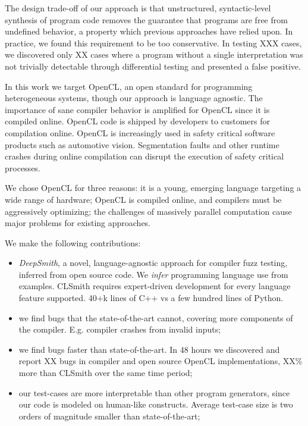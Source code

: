 The design trade-off of our approach is that unstructured, syntactic-level synthesis of program code removes the guarantee that programs are free from undefined behavior, a property which previous approaches have relied upon. In practice, we found this requirement to be too conservative. In testing XXX cases, we discovered only XX cases where a program without a single interpretation was not trivially detectable through differential testing and presented a false positive.

In this work we target OpenCL, an open standard for programming heterogeneous systems, though our approach is language agnostic. The importance of sane compiler behavior is amplified for OpenCL since it is compiled online. OpenCL code is shipped by developers to customers for compilation online. OpenCL is increasingly used in safety critical software products such as automotive vision. Segmentation faults and other runtime crashes during online compilation can disrupt the execution of safety critical processes.

We chose OpenCL for three reasons:
it is a young, emerging language targeting a wide range of hardware;
OpenCL is compiled online, and compilers must be aggressively optimizing;
the challenges of massively parallel computation cause major problems for existing approaches.

We make the following contributions:
%
\begin{itemize}
\item \emph{DeepSmith}, a novel, language-agnostic approach for compiler fuzz testing, inferred from open source code. We \emph{infer} programming language use from examples. CLSmith requires expert-driven development for every language feature supported. 40+k lines of C++ vs a few hundred lines of Python.
\item we find bugs that the state-of-the-art cannot, covering more components of the compiler. E.g. compiler crashes from invalid inputs;
\item we find bugs faster than state-of-the-art. In 48 hours we discovered and report XX bugs in compiler and open source OpenCL implementations, XX\% more than CLSmith over the same time period;
\item our test-cases are more interpretable than other program generators, since our code is modeled on human-like constructs. Average test-case size is two orders of magnitude smaller than state-of-the-art;
\end{itemize}
